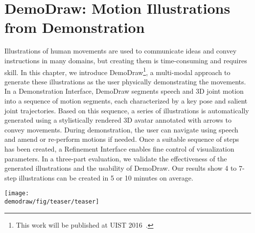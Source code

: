 
\chapter{DemoDraw: Motion Illustrations from Demonstration}
\label{chapter_demodraw}

\newcommand{\systemname}{DemoDraw}
\newcommand{\phaseI}{Demonstration Interface}
\newcommand{\phaseII}{Refinement Interface}

Illustrations of human movements are used to communicate ideas and convey instructions in many domains, but creating them is time-consuming and requires skill. In this chapter, we introduce DemoDraw\footnote{This work will be published at UIST 2016~\cite{Chi:2016:DemoDraw}.}, a multi-modal approach to generate these illustrations as the user physically demonstrating the movements. In a Demonstration Interface, DemoDraw segments speech and 3D joint motion into a sequence of motion segments, each characterized by a key pose and salient joint trajectories. Based on this sequence, a series of illustrations is automatically generated using a stylistically rendered 3D avatar annotated with arrows to convey movements. During demonstration, the user can navigate using speech and amend or re-perform motions if needed. Once a suitable sequence of steps has been created, a Refinement Interface enables fine control of visualization parameters. In a three-part evaluation, we validate the effectiveness of the generated illustrations and the usability of DemoDraw. Our results show 4 to 7-step illustrations can be created in 5 or 10 minutes on average.

\begin{figure*}[t]
  \centering
  \texttt{[image: \\demodraw/fig/teaser/teaser]}
  \caption{\systemname{}: (a) multi-modal ``\phaseI{}'' to capture motion, verify results, and re-perform portions if needed; (b) conventional \phaseII{} for refinement and exploring other visualization styles; (c-d) examples of illustration styles.}
  \label{fig:demodraw_teaser}
\end{figure*}









